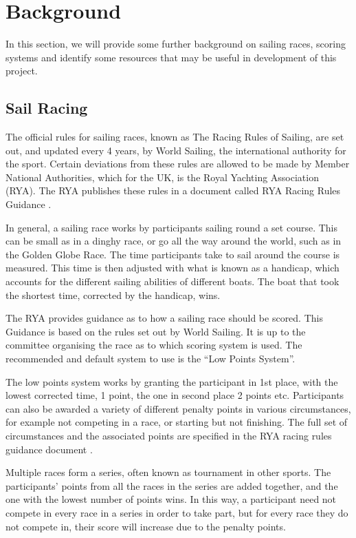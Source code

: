 \documentclass{l4proj}
\begin{document}
\chapter{Background}\label{chap:Back}
In this section, we will provide some further background on sailing races, scoring systems and identify some resources that may be useful in development of this project. 

\section{Sail Racing}
The official rules for sailing races, known as The Racing Rules of Sailing, are set out, and updated every 4 years, by World Sailing, the international authority for the sport. Certain deviations from these rules are allowed to be made by Member National Authorities, which for the UK, is the Royal Yachting Association (RYA). The RYA publishes these rules in a document called RYA Racing Rules Guidance \citep{RYAscore}.

In general, a sailing race works by participants sailing round a set course. This can be small as in a dinghy race, or go all the way around the world, such as in the Golden Globe Race. The time participants take to sail around the course is measured. This time is then adjusted with what is known as a handicap, which accounts for the different sailing abilities of different boats. The boat that took the shortest time, corrected by the handicap, wins.

The RYA provides guidance as to how a sailing race should be scored. This Guidance is based on the rules set out by World Sailing. It is up to the committee organising the race as to which scoring system is used. The recommended and default system to use is the “Low Points System”.

The low points system works by granting the participant in 1st place, with the lowest corrected time, 1 point, the one in second place 2 points etc. Participants can also be awarded a variety of different penalty points in various circumstances, for example not competing in a race, or starting but not finishing. The full set of circumstances and the associated points are specified in the RYA racing rules guidance document \citep{RYAscore}.

Multiple races form a series, often known as tournament in other sports. The participants' points from all the races in the series are added together, and the one with the lowest number of points wins. In this way, a participant need not compete in every race in a series in order to take part, but for every race they do not compete in, their score will increase due to the penalty points.
\end{document}
